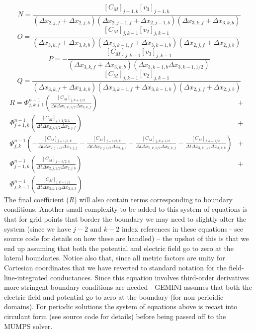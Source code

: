 \documentclass[11pt,letterpaper]{article}
\begin{document}
\begin{equation}
N = \frac{[C_M]_{j-1,k} [v_3]_{j-1,k} }{ \left( \Delta x_{2,j,f}+\Delta x_{2,j,b} \right) \left( \Delta x_{2,j-1,f}+\Delta x_{2,j-1,b} \right) \left( \Delta x_{3,k,f}+\Delta x_{3,k,b} \right) }
\end{equation}
\begin{equation}
O = \frac{[C_M]_{j,k-1} [v_2]_{j,k-1} }{ \left( \Delta x_{3,k,f}+\Delta x_{3,k,b} \right) \left( \Delta x_{3,k-1,f}+\Delta x_{3,k-1,b} \right) \left( \Delta x_{2,j,f}+\Delta x_{2,j,b} \right) }
\end{equation}
\begin{equation}
P = - \frac{[C_M]_{j,k-1} [v_{3}]_{j,k-1}}{\left( \Delta x_{3,k,f} + \Delta x_{3,k,b} \right) \left( \Delta x_{3,k-1,b} \Delta x_{3,k-1,1/2} \right)}
\end{equation}
\begin{equation}
Q = \frac{[C_M]_{j,k-1} [v_2]_{j,k-1} }{ \left( \Delta x_{3,k,f}+\Delta x_{3,k,b} \right) \left( \Delta x_{3,k-1,f}+\Delta x_{3,k-1,b} \right) \left( \Delta x_{2,j,f}+\Delta x_{2,j,b} \right) }
\end{equation}
\begin{eqnarray}
R = \Phi_{j,k+1}^{n-1} \left( \frac{[C_M]_{j,k+1/2}}{\Delta t \Delta x_{3,k,1/2} \Delta x_{3,k,f}} \right) &+& \nonumber \\
\Phi_{j+1,k}^{n-1} \left( \frac{[C_M]_{j+1/2,k}}{\Delta t \Delta x_{2,j,1/2} \Delta x_{2,j,f}} \right) &+& \nonumber \\
\Phi_{j,k}^{n-1} \left( -\frac{[C_M]_{j+1/2,k}}{\Delta t \Delta x_{2,j,1/2} \Delta x_{2,j,f}}  - \frac{[C_M]_{j-1/2,k}}{\Delta t \Delta x_{2,j,1/2} \Delta x_{2,j,b}} - \frac{[C_M]_{j,k+1/2}}{\Delta t \Delta x_{3,k,1/2} \Delta x_{3,k,f}} - \frac{[C_M]_{j,k-1/2}}{\Delta t \Delta x_{3,k,1/2} \Delta x_{3,k,b}} \right) &+& \nonumber \\
\Phi_{j-1,k}^{n-1} \left( \frac{[C_M]_{j-1/2,k}}{\Delta t \Delta x_{2,j,1/2} \Delta x_{2,j,b}} \right) &+& \nonumber \\
\Phi_{j,k-1}^{n-1} \left( \frac{[C_M]_{j,k-1/2}}{\Delta t \Delta x_{3,k,1/2} \Delta x_{3,k,b}} \right)
\end{eqnarray}
The final coefficient ($R$) will also contain terms corresponding to boundary conditions.  Another small complexity to be added to this system of equations is that for grid points that border the boundary we may need to slightly alter the system (since we have $j-2$ and $k-2$ index references in these equations - see source code for details on how these are handled) -- the upshot of this is that we end up assuming that both the potential and electric field go to zero at the lateral boundaries.  Notice also that, since all metric factors are unity for Cartesian coordinates that we have reverted to standard notation for the field-line-integrated conductances.  Since this equation involves third-order derivatives more stringent boundary conditions are needed - GEMINI assumes that both the electric field and potential go to zero at the boundary (for non-perioidic domains).  For periodic solutions the system of equations above is recast into circulant form (see source code for details) before being passed off to the MUMPS solver.  
\end{document}
